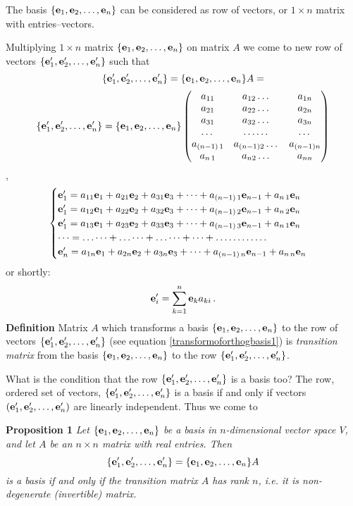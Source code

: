 \documentclass[12pt]{article}
\numberwithin{equation}{section}
\begin{document}
The basis $\{{\bf e}_1,{\bf e}_2,\dots,{\bf e}_n\}$ can be considered as row of vectors,
or $1\times n$ matrix with entries--vectors.


Multiplying  $1\times n$ matrix $\{{\bf e}_1,{\bf e}_2,\dots,{\bf e}_n\}$ on matrix $A$ we come to new row of vectors
$\{{\bf e}'_1,{\bf e}'_2,\dots,{\bf e}'_n\}$ such that
 \begin{equation}\label{transformoforthogbasis0}
  \{{\bf e}'_1,{\bf e}'_2,\dots,{\bf e}'_n\}=\{{\bf e}_1,{\bf e}_2,\dots,{\bf e}_n\}A=
 \end{equation}
    \begin{equation}\label{transformoforthogbasis}
\{{\bf e}'_1,{\bf e}'_2,\dots,{\bf e}'_n\}=\{{\bf e}_1,{\bf e}_2,\dots,{\bf e}_n\}
\begin{pmatrix}
   a_{11} &a_{12}\dots &a_{1n}\cr
   a_{21} &a_{22}\dots &a_{2n}\cr
 a_{31} &a_{32}\dots &a_{3n}\cr
 \dots &\dots\dots &\dots\cr
 a_{(n-1)\, 1} &a_{(n-1) 2}\dots &a_{(n-1)n}\cr
 a_{n\,1} &a_{n 2}\dots &a_{n n}\cr
\end{pmatrix}
\end{equation},
            $$
        \begin{cases}
        {\bf e}'_1=a_{11}{\bf e}_1+a_{21}{\bf e}_2+a_{31}{\bf e}_3+\dots+a_{(n-1)\, 1}{\bf e}_{n-1}+a_{n\, 1}{\bf e}_n\cr
        {\bf e}'_1=a_{12}{\bf e}_1+a_{22}{\bf e}_2+a_{32}{\bf e}_3+\dots+a_{(n-1)\, 2}{\bf e}_{n-1}+a_{n\, 2}{\bf e}_n\cr
        {\bf e}'_1=a_{13}{\bf e}_1+a_{23}{\bf e}_2+a_{33}{\bf e}_3+\dots+a_{(n-1)\, 3}{\bf e}_{n-1}+a_{n\, 1}{\bf e}_n\cr
        \dots=\dots\dots+\dots\dots+\dots\dots+\dots+\dots\dots \dots\dots\cr
        {\bf e}'_n=a_{1n}{\bf e}_1+a_{2n}{\bf e}_2+a_{3n}{\bf e}_3+\dots+a_{(n-1)\, n}{\bf e}_{n-1}+a_{n\, n}{\bf e}_n\cr
        \end{cases}
          $$
         or shortly:
        \begin{equation}\label{transformoforthogbasis1}
               {\bf e}_i'=\sum_{k=1}^n {\bf e}_k a_{ki}\,.
         \end{equation}
 {\bf Definition } Matrix $A$ which transforms a 
  basis $\{{\bf e}_1,{\bf e}_2,\dots,{\bf e}_n\}$
  to the row of vectors  $\{{\bf e}'_1,{\bf e}'_2,\dots,{\bf e}'_n\}$ 
(see equation \eqref{transformoforthogbasis1})
  is  {\it transition matrix} from the basis 
$\{{\bf e}_1,{\bf e}_2,\dots,{\bf e}_n\}$ to the row
  $\{{\bf e}'_1,{\bf e}'_2,\dots,{\bf e}'_n\}$.


 What is the condition that  the row $\{{\bf e}'_1,{\bf e}'_2,\dots,{\bf e}'_n\}$ 
is a basis too?
 The row, ordered set of vectors,
 $\{{\bf e}'_1,{\bf e}'_2,\dots,{\bf e}'_n\}$ is a basis if and only if vectors $({\bf e}'_1,{\bf e}'_2,\dots,{\bf e}'_n)$
are  linearly independent. Thus  we come to

{\bf Proposition 1} {\it Let $\{{\bf e}_1,{\bf e}_2,\dots,{\bf e}_n\}$ be a basis in 
$n$-dimensional
 vector space $V$, and let $A$ be an
$n\times n$ matrix with real entries.
Then
                      \begin{equation}\label{transitionmatrix}
                      \{{\bf e}'_1,{\bf e}'_2,\dots,{\bf e}'_n\}=\{{\bf e}_1,{\bf e}_2,\dots,{\bf e}_n\}A
                       \end{equation}
                       is a basis if and only if the transition
matrix $A$ has rank $n$, i.e. it is non-degenerate (invertible) matrix.}
\end{document}

